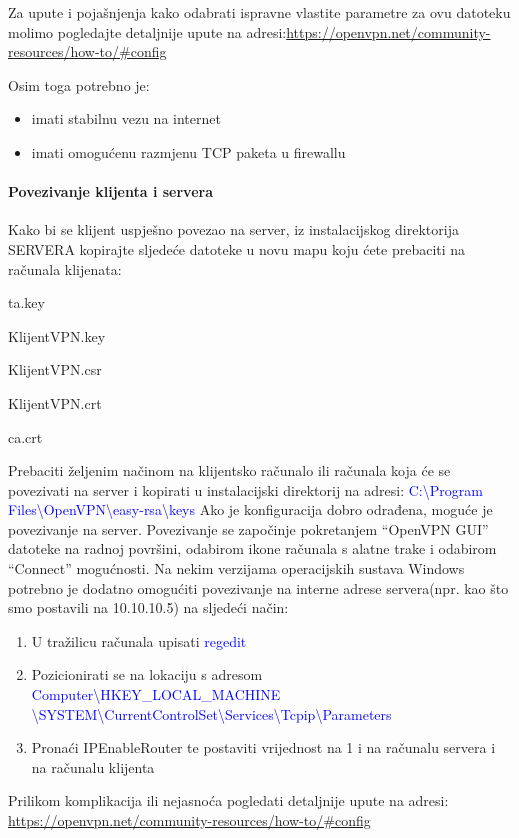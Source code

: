 Za upute i pojašnjenja kako odabrati ispravne vlastite parametre za ovu datoteku molimo pogledajte detaljnije upute na adresi:\smallbreak \url{https://openvpn.net/community-resources/how-to/\#config}\smallbreak

Osim toga potrebno je:
\begin{itemize}
	\item imati stabilnu vezu na internet
	\item imati omogućenu razmjenu TCP paketa u firewallu
\end{itemize}	

\paragraph*{Povezivanje klijenta i servera}
\hfill \bigbreak
Kako bi se klijent uspješno povezao na server, iz instalacijskog direktorija SERVERA kopirajte sljedeće datoteke u novu mapu koju ćete prebaciti na računala klijenata:

ta.key

KlijentVPN.key

KlijentVPN.csr

KlijentVPN.crt

ca.crt

Prebaciti željenim načinom na klijentsko računalo ili računala koja će se povezivati na server i kopirati u instalacijski direktorij na adresi:\smallbreak
\textcolor{blue}{C:\textbackslash Program Files\textbackslash OpenVPN\textbackslash easy-rsa\textbackslash keys}
\smallbreak
Ako je konfiguracija dobro odrađena, moguće je povezivanje na server. Povezivanje se započinje pokretanjem ``OpenVPN GUI'' datoteke na radnoj površini, odabirom ikone računala s alatne trake i odabirom ``Connect'' mogućnosti.
\bigbreak
Na nekim verzijama operacijskih sustava Windows potrebno je dodatno omogućiti povezivanje na interne adrese servera(npr. kao što smo postavili na 10.10.10.5) na sljedeći način:
\begin{enumerate}
  \item U tražilicu računala upisati \textcolor{blue}{regedit}
  \item Pozicionirati se na lokaciju s adresom \textcolor{blue}{Computer\textbackslash HKEY\_LOCAL\_MACHINE\newline
  \textbackslash SYSTEM\textbackslash CurrentControlSet\textbackslash Services\textbackslash Tcpip\textbackslash Parameters}
  \item Pronaći IPEnableRouter te postaviti vrijednost na 1 i na računalu servera i na računalu klijenta
\end{enumerate}
\bigbreak

Prilikom komplikacija ili nejasnoća pogledati detaljnije upute na adresi:\smallbreak
\url{https://openvpn.net/community-resources/how-to/\#config}
\smallbreak